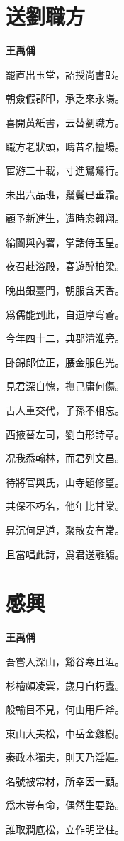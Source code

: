 \documentclass[12pt,a4paper]{ctexbook}
\begin{document}
\section{送劉職方}
\textbf{王禹偁}\par\vspace{0.5em}
罷直出玉堂，詔授尚書郎。\par
朝僉假郡印，承乏來永陽。\par
喜開黄紙書，云替劉職方。\par
職方老狀頭，疇昔名擅場。\par
宦游三十載，寸進鴛鷺行。\par
未出六品班，鬚鬢已垂霜。\par
顧予新進生，遭時恣翱翔。\par
綸闈與內署，掌誥侍玉皇。\par
夜召赴浴殿，春遊醉柏梁。\par
晚出銀臺門，朝服含天香。\par
爲儒能到此，自道摩穹蒼。\par
今年四十二，典郡清淮旁。\par
卧錦郎位正，腰金服色光。\par
見君深自愧，撫己庸何傷。\par
古人重交代，子孫不相忘。\par
西掖替左司，劉白形詩章。\par
况我忝翰林，而君列文昌。\par
待將官與氏，山寺題修篁。\par
共保不朽名，他年比甘棠。\par
昇沉何足道，聚散安有常。\par
且當唱此詩，爲君送離觴。\par

\section{感興}
\textbf{王禹偁}\par\vspace{0.5em}
吾嘗入深山，谿谷寒且沍。\par
杉檜頗凌雲，歲月自朽蠹。\par
般輸目不見，何由用斤斧。\par
東山大夫松，中岳金雞樹。\par
秦政本獨夫，則天乃淫嫗。\par
名號被常材，所幸因一顧。\par
爲木豈有命，偶然生要路。\par
誰取澗底松，立作明堂柱。\par
\end{document}
